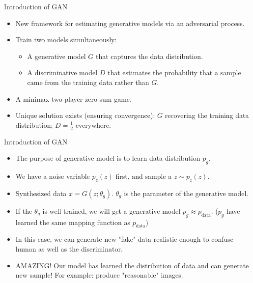 \documentclass[10pt]{beamer}
\begin{document}
	\begin{frame}{Introduction of GAN}
		\begin{itemize}
			\pause
			\item New framework for estimating generative models via an adversarial process.
			\pause
			\item Train two models simultaneously:
			\begin{itemize}
				\pause
				\item A generative model $G$ that captures the data distribution.
				\pause
				\item A discriminative model $D$ that estimates the probability that a sample came from the training data rather than $G$.
			\end{itemize}
			\pause
			\item A minimax two-player zero-sum game.
			\pause
			\item Unique solution exists (ensuring convergence): $G$ recovering the training data distribution; $D=\frac{1}{2}$ everywhere.
		\end{itemize}
	\end{frame}

	\begin{frame}{Introduction of GAN}
		\begin{itemize}
			\item The purpose of generative model is to learn data distribution $p_g$.
			\pause
			\item We have a noise variable $p_z(z)$ first, and sample a $z\sim p_z(z)$.
			\pause
			\item Synthesized data $\hat{x}=G(z;\theta_g)$. $\theta_g$ is the parameter of the generative model.
			\pause
			\item If the $\theta_g$ is well trained, we will get a generative model $p_g\approx p_{\text{data}}$. ($p_g$ have learned the same mapping function as $p_{\text{data}}$)
			\pause
			\item In this case, we can generate new "fake" data realistic enough to confuse human as well as the discriminator.
			\pause
			\item AMAZING! Our model has learned the distribution of data and can generate new sample! For example: produce "reasonable" images.
		\end{itemize}
	\end{frame}
\end{document}
